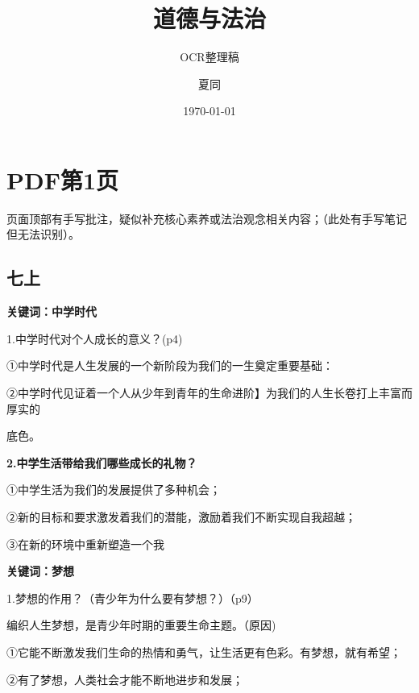 \documentclass[lang=cn,11pt]{elegantbook}
\title{道德与法治}
\subtitle{OCR整理稿}
\author{夏同}
\institute{华南理工大学}
\date{\today}
\newcommand{\daofasym}[1]{{\daofasymbolfont #1}}
\newcommand{\daofasym}[1]{#1}
\begin{document}
\section*{PDF第1页}

\begin{note}[手写批注]
页面顶部有手写批注，疑似补充核心素养或法治观念相关内容；（此处有手写笔记但无法识别）。\par
\end{note}

\subsection*{七上}

\textbf{关键词：中学时代}\par

1.中学时代对个人成长的意义？(p4)\par

\daofasym{①}中学时代是人生发展的一个新阶段为我们的一生奠定重要基础：\par

\daofasym{②}中学时代见证着一个人从少年到青年的生命进阶】为我们的人生长卷打上丰富而厚实的\par

底色。\par

\textbf{2.中学生活带给我们哪些成长的礼物？}\par

\daofasym{①}中学生活为我们的发展提供了多种机会；\par

\daofasym{②}新的目标和要求激发着我们的潜能，激励着我们不断实现自我超越；\par

\daofasym{③}在新的环境中重新塑造一个我\par

\textbf{关键词：梦想}\par

1.梦想的作用？（青少年为什么要有梦想？）（p9）\par

编织人生梦想，是青少年时期的重要生命主题。（原因)\par

\daofasym{①}它能不断激发我们生命的热情和勇气，让生活更有色彩。有梦想，就有希望；\par

\daofasym{②}有了梦想，人类社会才能不断地进步和发展；\par
\end{document}
